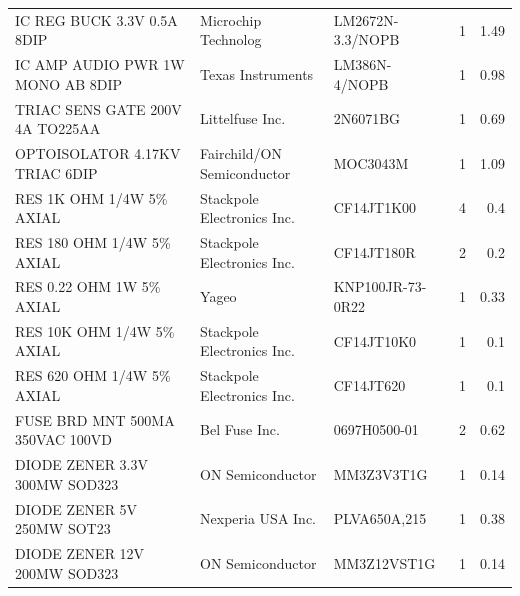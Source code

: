 \documentclass[journal,compsoc]{IEEEtran}
\begin{document}
\begin{table}[]
\begin{tabular}{|rrr|r|r|}
    \multicolumn{1}{|l}{IC REG BUCK 3.3V 0.5A 8DIP} & \multicolumn{1}{l}{Microchip Technolog} & \multicolumn{1}{l}{LM2672N-3.3/NOPB} & \multicolumn{1}{r}{1} & 1.49 \\
    \multicolumn{1}{|l}{IC AMP AUDIO PWR 1W MONO AB 8DIP} & \multicolumn{1}{l}{Texas Instruments} & \multicolumn{1}{l}{LM386N-4/NOPB} & \multicolumn{1}{r}{1} & 0.98 \\
    \multicolumn{1}{|l}{TRIAC SENS GATE 200V 4A TO225AA} & \multicolumn{1}{l}{Littelfuse Inc.} & \multicolumn{1}{l}{2N6071BG} & \multicolumn{1}{r}{1} & 0.69 \\
    \multicolumn{1}{|l}{OPTOISOLATOR 4.17KV TRIAC 6DIP} & \multicolumn{1}{l}{Fairchild/ON Semiconductor} & \multicolumn{1}{l}{MOC3043M} & \multicolumn{1}{r}{1} & 1.09 \\
    \multicolumn{1}{|l}{RES 1K OHM 1/4W 5\% AXIAL} & \multicolumn{1}{l}{Stackpole Electronics Inc.} & \multicolumn{1}{l}{CF14JT1K00} & \multicolumn{1}{r}{4} & 0.4 \\
    \multicolumn{1}{|l}{RES 180 OHM 1/4W 5\% AXIAL} & \multicolumn{1}{l}{Stackpole Electronics Inc.} & \multicolumn{1}{l}{CF14JT180R} & \multicolumn{1}{r}{2} & 0.2 \\
    \multicolumn{1}{|l}{RES 0.22 OHM 1W 5\% AXIAL} & \multicolumn{1}{l}{Yageo} & \multicolumn{1}{l}{KNP100JR-73-0R22} & \multicolumn{1}{r}{1} & 0.33 \\
    \multicolumn{1}{|l}{RES 10K OHM 1/4W 5\% AXIAL} & \multicolumn{1}{l}{Stackpole Electronics Inc.} & \multicolumn{1}{l}{CF14JT10K0} & \multicolumn{1}{r}{1} & 0.1 \\
    \multicolumn{1}{|l}{RES 620 OHM 1/4W 5\% AXIAL} & \multicolumn{1}{l}{Stackpole Electronics Inc.} & \multicolumn{1}{l}{CF14JT620} & \multicolumn{1}{r}{1} & 0.1 \\
    \multicolumn{1}{|l}{FUSE BRD MNT 500MA 350VAC 100VD
} & \multicolumn{1}{l}{Bel Fuse Inc.} & \multicolumn{1}{l}{0697H0500-01} & \multicolumn{1}{r}{2} & 0.62 \\
    \multicolumn{1}{|l}{DIODE ZENER 3.3V 300MW SOD323} & \multicolumn{1}{l}{ON Semiconductor} & \multicolumn{1}{l}{MM3Z3V3T1G} & \multicolumn{1}{r}{1} & 0.14 \\
    \multicolumn{1}{|l}{DIODE ZENER 5V 250MW SOT23} & \multicolumn{1}{l}{Nexperia USA Inc.} & \multicolumn{1}{l}{PLVA650A,215} & \multicolumn{1}{r}{1} & 0.38 \\
    \multicolumn{1}{|l}{DIODE ZENER 12V 200MW SOD323} & \multicolumn{1}{l}{ON Semiconductor} & \multicolumn{1}{l}{MM3Z12VST1G} & \multicolumn{1}{r}{1} & 0.14 \\

\end{tabular}
\end{table}
\end{document}
